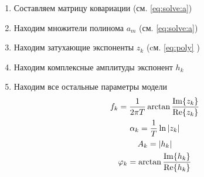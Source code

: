 \documentclass[a4paper,14pt]{extarticle}
\renewcommand*{\phi}{\varphi}
\begin{document}
\label{par:itog}


\begin{enumerate}
    \item Составляем матрицу ковариации (см. \eqref{eq:solve:a})  
    \item Находим множители полинома $a_m$  (см. \eqref{eq:solve:a})  
    \item Находим затухающие экспоненты $z_k$ (cм. \eqref{eq:poly} )
    \item Находим комплексные амплитуды экспонент $h_k$ 
    \item Находим все остальные параметры модели
        \begin{gather}
            f_k = \frac{1}{2 \pi T} \arctan{\frac{\Im{z_k}}{\Re{z_k}}} \\
            \alpha_k = \frac{1}{T} \ln\abs{z_k} \\
            A_k = \abs{h_k}\\
            \phi_k =  \arctan{\frac{\Im{h_k}}{\Re{h_k}}} \\
        \end{gather}
\end{enumerate}







\end{document}
